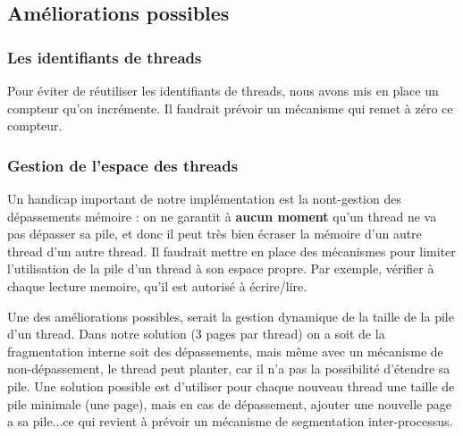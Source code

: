 \documentclass[a4paper,10pt]{article}
\begin{document}
\subsection{Améliorations possibles}

\subsubsection{Les identifiants de threads}

Pour éviter de réutiliser les identifiants de threads, nous avons mis en place
un compteur qu'on incrémente. Il faudrait prévoir un mécanisme qui remet à zéro
ce compteur.

\subsubsection{Gestion de l'espace des threads}

Un handicap important de notre implémentation est la nont-gestion des
dépassements mémoire : on ne garantit à \textbf{aucun moment} qu'un thread ne va
pas dépasser sa pile, et donc il peut très bien écraser la mémoire d'un autre
thread d'un autre thread. Il faudrait mettre en place des mécanismes pour
limiter l'utilisation de la pile d'un thread à son espace propre. Par exemple,
vérifier à chaque lecture memoire, qu'il est autorisé à écrire/lire.

Une des améliorations possibles, serait la gestion dynamique de la taille
de la pile d'un thread. Dans notre solution (3 pages par thread) on a soit de
la fragmentation interne soit des dépassements, mais même avec un mécanisme de
non-dépassement, le thread peut planter, car il n'a pas la possibilité
d'étendre sa pile. Une solution possible est d'utiliser pour
chaque nouveau thread une taille de pile minimale (une page), mais en cas de
dépassement, ajouter une nouvelle page a sa pile...ce qui revient à prévoir un
mécanisme de segmentation inter-processus.
\end{document}
